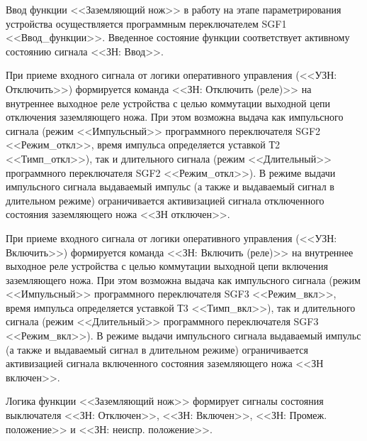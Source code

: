 
\begin{flushleft}
\color{black}
\nopagebreak
\end{flushleft}

\par
Ввод функции <<Заземляющий нож>> в работу на этапе параметрирования устройства осуществляется программным переключателем SGF1 <<Ввод\_функции>>. Введенное состояние функции соответствует активному состоянию сигнала <<ЗН: Ввод>>.

\par
При приеме входного сигнала от логики оперативного управления (<<УЗН: Отключить>>) формируется команда <<ЗН: Отключить (реле)>> на внутреннее выходное реле устройства с целью коммутации выходной цепи отключения заземляющего ножа. При этом возможна выдача как импульсного сигнала (режим <<Импульсный>> программного переключателя SGF2 <<Режим\_откл>>, время импульса определяется уставкой Т2 <<Тимп\_откл>>), так и длительного сигнала (режим <<Длительный>> программного переключателя SGF2 <<Режим\_откл>>). 
В режиме выдачи импульсного сигнала выдаваемый импульс (а также и выдаваемый сигнал в длительном режиме) ограничивается активизацией сигнала отключенного состояния заземляющего ножа <<ЗН отключен>>.

\par
При приеме входного сигнала от логики оперативного управления (<<УЗН: Включить>>) формируется команда <<ЗН: Включить (реле)>> на внутреннее выходное реле устройства с целью коммутации выходной цепи включения заземляющего ножа. При этом возможна выдача как импульсного сигнала (режим <<Импульсный>> программного переключателя SGF3 <<Режим\_вкл>>, время импульса определяется уставкой Т3 <<Тимп\_вкл>>), так и длительного сигнала (режим <<Длительный>> программного переключателя SGF3 <<Режим\_вкл>>).
В режиме выдачи импульсного сигнала выдаваемый импульс (а также и выдаваемый сигнал в длительном режиме) ограничивается активизацией сигнала включенного состояния заземляющего ножа <<ЗН включен>>.

\par
Логика функции <<Заземляющий нож>> формирует сигналы состояния выключателя <<ЗН: Отключен>>, <<ЗН: Включен>>, <<ЗН: Промеж. положение>> и <<ЗН: неиспр. положение>>.

